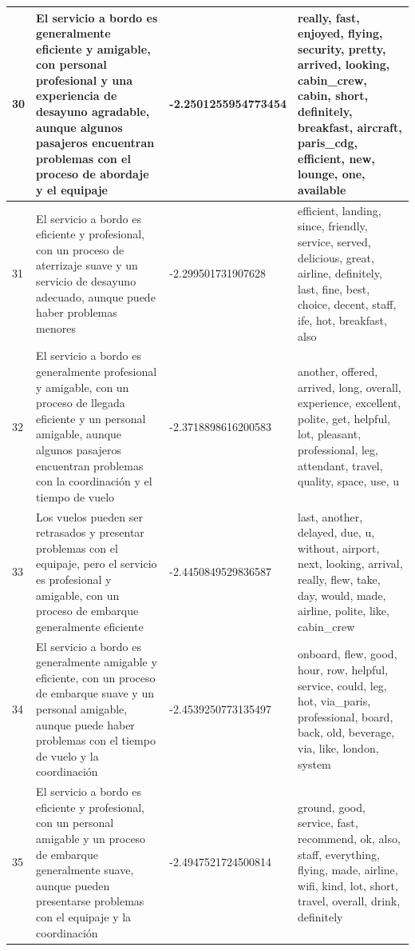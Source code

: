 \documentclass{report}
\begin{document}
\begin{longtable}{|p{1cm}|p{4cm}|p{4cm}|p{6cm}|}
                    \hline
                    30 & El servicio a bordo es generalmente eficiente y amigable, con personal profesional y una experiencia de desayuno agradable, aunque algunos pasajeros encuentran problemas con el proceso de abordaje y el equipaje & -2.2501255954773454 & really, fast, enjoyed, flying, security, pretty, arrived, looking, cabin\_crew, cabin, short, definitely, breakfast, aircraft, paris\_cdg, efficient, new, lounge, one, available \\
                    \hline
                    31 & El servicio a bordo es eficiente y profesional, con un proceso de aterrizaje suave y un servicio de desayuno adecuado, aunque puede haber problemas menores & -2.299501731907628 & efficient, landing, since, friendly, service, served, delicious, great, airline, definitely, last, fine, best, choice, decent, staff, ife, hot, breakfast, also \\
                    \hline
                    32 & El servicio a bordo es generalmente profesional y amigable, con un proceso de llegada eficiente y un personal amigable, aunque algunos pasajeros encuentran problemas con la coordinación y el tiempo de vuelo & -2.3718898616200583 & another, offered, arrived, long, overall, experience, excellent, polite, get, helpful, lot, pleasant, professional, leg, attendant, travel, quality, space, use, u \\
                    \hline
                    33 & Los vuelos pueden ser retrasados y presentar problemas con el equipaje, pero el servicio es profesional y amigable, con un proceso de embarque generalmente eficiente & -2.4450849529836587 & last, another, delayed, due, u, without, airport, next, looking, arrival, really, flew, take, day, would, made, airline, polite, like, cabin\_crew \\
                    \hline
                    34 & El servicio a bordo es generalmente amigable y eficiente, con un proceso de embarque suave y un personal amigable, aunque puede haber problemas con el tiempo de vuelo y la coordinación & -2.4539250773135497 & onboard, flew, good, hour, row, helpful, service, could, leg, hot, via\_paris, professional, board, back, old, beverage, via, like, london, system \\
                    \hline
                    35 & El servicio a bordo es eficiente y profesional, con un personal amigable y un proceso de embarque generalmente suave, aunque pueden presentarse problemas con el equipaje y la coordinación & -2.4947521724500814 & ground, good, service, fast, recommend, ok, also, staff, everything, flying, made, airline, wifi, kind, lot, short, travel, overall, drink, definitely \\

\end{longtable}
\end{document}
